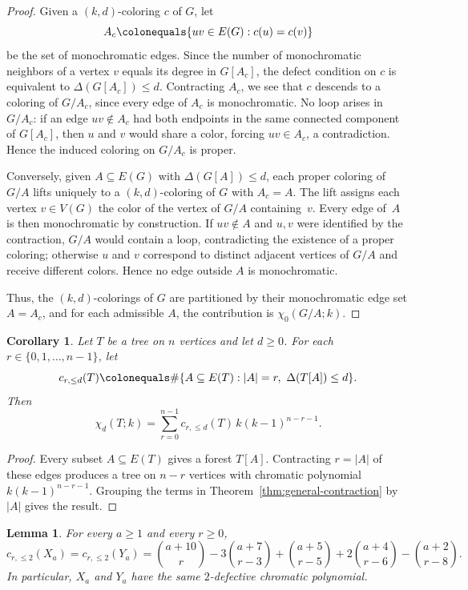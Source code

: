 \documentclass[10pt,a4paper]{amsart}
\newtheorem{lem}[thm]{Lemma}
\newtheorem{cor}[thm]{Corollary}
\theoremstyle{definition}
\begin{document}
\begin{proof}
Given a $(k,d)$-coloring $c$ of $G$, let
\[
A_c\colonequals \{uv\in E(G): c(u)=c(v)\}
\]
be the set of monochromatic edges. Since the number of monochromatic neighbors of a vertex $v$ equals its degree in $G[A_c]$, the defect condition on $c$ is equivalent to $\Delta(G[A_c])\leq d$. Contracting $A_c$, we see that $c$ descends to a coloring of $G/A_c$, since every edge of $A_c$ is monochromatic. No loop arises in $G/A_c$: if an edge $uv\notin A_c$ had both endpoints in the same connected component of $G[A_c]$, then $u$ and $v$ would share a color, forcing $uv\in A_c$, a contradiction. Hence the induced coloring on $G/A_c$ is proper.

Conversely, given $A\subseteq E(G)$ with $\Delta(G[A])\leq d$, each proper coloring of $G/A$ lifts uniquely to a $(k,d)$-coloring of $G$ with $A_c=A$. The lift assigns each vertex $v\in V(G)$ the color of the vertex of $G/A$ containing~$v$. Every edge of~$A$ is then monochromatic by construction. If $uv\notin A$ and $u,v$ were identified by the contraction, $G/A$ would contain a loop, contradicting the existence of a proper coloring; otherwise $u$ and $v$ correspond to distinct adjacent vertices of $G/A$ and receive different colors. Hence no edge outside $A$ is monochromatic.

Thus, the $(k, d)$-colorings of $G$ are partitioned by their monochromatic edge set $A=A_{c}$, and for each admissible $A$, the contribution is $\chi_0(G/A;k)$.
\end{proof}

\setcounter{thm}{1}
\begin{cor}\label{cor:tree-expansion}
Let $T$ be a tree on $n$ vertices and let $d\geq 0$. For each $r\in \{0,1,\dots,n-1\}$, let
\[
c_{r,\leq d}(T)\colonequals \#\{A\subseteq E(T) : |A|=r,\ \Delta(T[A])\leq d\}.
\]
Then
\[
\chi_d(T;k)=\sum_{r=0}^{n-1} c_{r,\leq d}(T)\,k(k-1)^{n-r-1}.
\]
\end{cor}

\begin{proof}
Every subset $A\subseteq E(T)$ gives a forest $T[A]$. Contracting $r=|A|$ of these edges produces a tree on $n-r$ vertices with chromatic polynomial $k(k-1)^{n-r-1}$. Grouping the terms in Theorem~\ref{thm:general-contraction} by $|A|$ gives the result.
\end{proof}

\setcounter{section}{5}
\setcounter{thm}{1}
\begin{lem}\label{lem:linear-forest-counts}
For every $a\geq 1$ and every $r\geq 0$,
\[
c_{r,\leq 2}(X_a)=c_{r,\leq 2}(Y_a)
=
\binom{a+10}{r}
-3\binom{a+7}{r-3}
+\binom{a+5}{r-5}
+2\binom{a+4}{r-6}
-\binom{a+2}{r-8}.
\]
In particular, $X_a$ and $Y_a$ have the same $2$-defective chromatic polynomial.
\end{lem}
\end{document}
